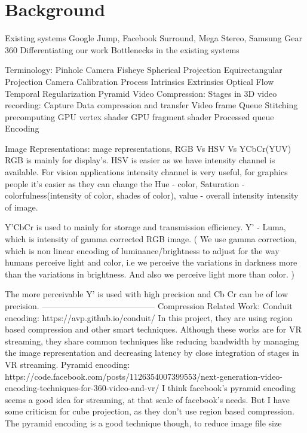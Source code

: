 \chapter{Background}
Existing systems \newline
Google Jump, Facebook Surround, Mega Stereo, Samsung Gear 360 \newline
Differentiating our work \newline
Bottlenecks in the existing systems \newline

Terminology:
Pinhole Camera
Fisheye
Spherical Projection
Equirectangular Projection
Camera Calibration Process
Intrinsics
Extrinsics
Optical Flow
Temporal Regularization
Pyramid
Video Compression: 
Stages in 3D video recording:
Capture
Data compression and transfer
Video frame Queue
Stitching precomputing
GPU vertex shader
GPU fragment shader
Processed queue 
Encoding

Image Representations:
mage representations, RGB Vs HSV Vs YCbCr(YUV)
RGB is mainly for display’s. HSV is easier as we have intensity channel is available. For vision applications intensity channel is very useful, for graphics people it’s easier as they can change the Hue - color, Saturation - colorfulness(intensity of color, shades of color), value - overall intensity  intensity of image. 

Y’CbCr is used to mainly for storage and transmission efficiency. Y’ - Luma, which is intensity of gamma corrected RGB image. 
( We use gamma correction, which is non linear encoding of luminance/brightness to adjust for the way humans perceive light and color, i.e we perceive the variations in darkness more than the variations in brightness. And also we perceive light more than color. )

The more perceivable Y’ is used with high precision and Cb Cr can be of low precision. 
-----------------------------------------
Compression Related Work: 
Conduit encoding:
https://avp.github.io/conduit/
In this  project, they are using region based compression and other smart techniques. Although these works are for VR streaming, they share common techniques like reducing bandwidth by managing the image representation and decreasing latency by close integration of stages in VR streaming.
Pyramid encoding: https://code.facebook.com/posts/1126354007399553/next-generation-video-encoding-techniques-for-360-video-and-vr/
I think facebook's pyramid encoding seems a good idea for streaming, at that scale of facebook's needs. But I have some criticism for  cube projection, as they don't use region based compression. The pyramid encoding is a good technique though, to reduce image file size


